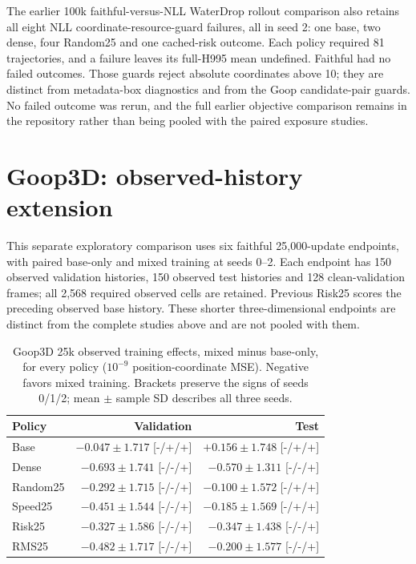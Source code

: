 The earlier 100k faithful-versus-NLL WaterDrop rollout comparison also retains all eight NLL coordinate-resource-guard failures, all in seed 2: one base, two dense, four Random25 and one cached-risk outcome. Each policy required 81 trajectories, and a failure leaves its full-H995 mean undefined. Faithful had no failed outcomes. Those guards reject absolute coordinates above 10; they are distinct from metadata-box diagnostics and from the Goop candidate-pair guards. No failed outcome was rerun, and the full earlier objective comparison remains in the repository rather than being pooled with the paired exposure studies.

\section{Goop3D: observed-history extension}
\label{sec:goop3d-25k-exposure}
This separate exploratory comparison uses six faithful 25,000-update endpoints, with paired base-only and mixed training at seeds 0--2. Each endpoint has 150 observed validation histories, 150 observed test histories and 128 clean-validation frames; all 2,568 required observed cells are retained. Previous Risk25 scores the preceding observed base history. These shorter three-dimensional endpoints are distinct from the complete studies above and are not pooled with them.

\begin{table}[!ht]
\centering\small
\setlength{\tabcolsep}{5pt}\renewcommand{\arraystretch}{1.12}
\caption{Goop3D 25k observed training effects, mixed minus base-only, for every policy ($10^{-9}$ position-coordinate MSE). Negative favors mixed training. Brackets preserve the signs of seeds 0/1/2; mean $\pm$ sample SD describes all three seeds.}
\label{tab:goop3d25k-observed-position-training}
\begin{tabular}{lrr}
\toprule
Policy & Validation & Test\\
\midrule
Base & $-0.047\pm1.717$ [-/+/+] & $+0.156\pm1.748$ [-/+/+]\\
Dense & $-0.693\pm1.741$ [-/-/+] & $-0.570\pm1.311$ [-/-/+]\\
Random25 & $-0.292\pm1.715$ [-/-/+] & $-0.100\pm1.572$ [-/+/+]\\
Speed25 & $-0.451\pm1.544$ [-/-/+] & $-0.185\pm1.569$ [-/+/+]\\
Risk25 & $-0.327\pm1.586$ [-/-/+] & $-0.347\pm1.438$ [-/-/+]\\
RMS25 & $-0.482\pm1.717$ [-/-/+] & $-0.200\pm1.577$ [-/-/+]\\
\bottomrule
\end{tabular}
\end{table}

